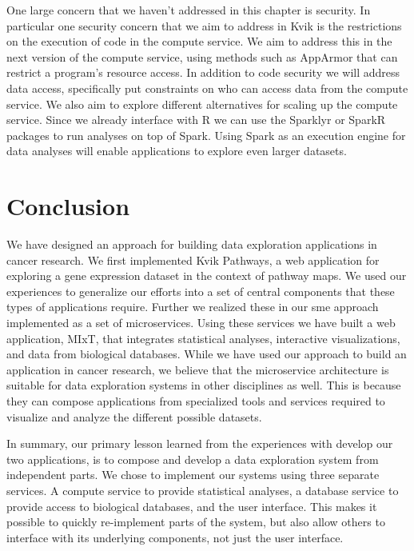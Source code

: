 One large concern that we haven't addressed in this chapter is security. In
particular one security concern that we aim to address in Kvik is the
restrictions on the execution of code in the compute service. We aim to address
this in the next version of the compute service, using methods such as
AppArmor\cite{apparmor} that can restrict a program's resource access. In
addition to code security we will address data access, specifically put
constraints on who can access data from the compute service.  We also aim to
explore different alternatives for scaling up the compute service.  Since we
already interface with R we can use the Sparklyr\cite{sparklyr} or
SparkR\cite{sparkr} packages to run analyses on top of
Spark.\cite{zaharia2012resilient} Using Spark as an execution engine for data
analyses will enable applications to explore even larger datasets.

\section{Conclusion}
We have designed an approach for building data exploration applications in
cancer research. We first implemented Kvik Pathways, a web application for
exploring a gene expression dataset in the context of pathway maps. We used our
experiences to generalize our efforts into a set of central components that
these types of applications require. Further we realized these in our \gls{sme}
approach implemented as a set of microservices.  Using these services we have
built a web application, MIxT, that integrates statistical analyses, interactive
visualizations, and data from biological databases. While we have used our
approach to build an application in cancer research, we believe that the
microservice architecture is suitable for data exploration systems in other
disciplines as well. This is because they can compose applications from
specialized tools and services required to visualize and analyze the different
possible datasets. 

In summary, our primary lesson learned from the experiences with develop our two
applications, is to compose and develop a data exploration system from
independent parts.  We chose to implement our systems using three separate
services. A compute service to provide statistical analyses, a database service
to provide access to biological databases, and the user interface. This makes it
possible to quickly re-implement parts of the system, but also allow others to
interface with its underlying components, not just the user interface. 
